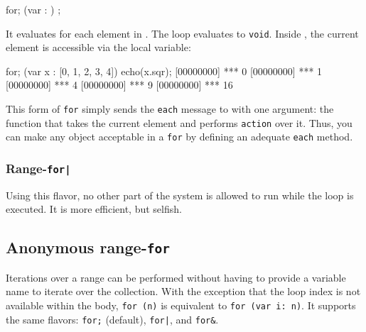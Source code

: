 \begin{urbiunchecked}
for; (var  : )
   ;
\end{urbiunchecked}

It evaluates  for each element in . The loop
evaluates to \lstinline{void}.  Inside , the current element is
accessible via the  local variable:

\begin{urbiscript}
for; (var x : [0, 1, 2, 3, 4])
  echo(x.sqr);
[00000000] *** 0
[00000000] *** 1
[00000000] *** 4
[00000000] *** 9
[00000000] *** 16
\end{urbiscript}

This form of \lstinline{for} simply sends the \lstinline{each} message to
 with one argument: the function that takes the current
element and performs \lstinline{action} over it. Thus, you can make any
object acceptable in a \lstinline{for} by defining an adequate
\lstinline{each} method.


\subsubsection{Range-\lstinline{for|}}
\label{sec:lang:foreach:pipe}

Using this flavor, no other part of the system is allowed to run while the
loop is executed.  It is more efficient, but selfish.

\subsection{Anonymous range-\lstinline{for}}
\label{sec:lang:forn}

Iterations over a range can be performed without having to provide a
variable name to iterate over the collection.  With the exception that the
loop index is not available within the body, \lstinline|for (n)| is
equivalent to \lstinline|for (var i: n)|.  It supports the same flavors:
\lstinline|for;| (default), \lstinline{for|}, and \lstinline|for&|.

